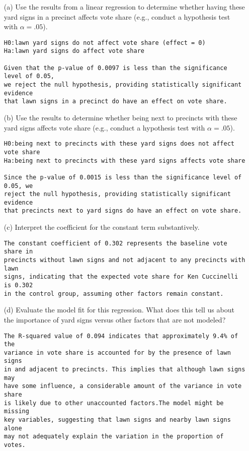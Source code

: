 \documentclass[12pt,letterpaper]{article}
\begin{document}
\begin{enumerate}
	\item [(a)] Use the results from a linear regression to determine whether having these yard signs in a precinct affects vote share (e.g., conduct a hypothesis test with $\alpha = .05$).
	
	\begin{verbatim}
H0:lawn yard signs do not affect vote share (effect = 0)
Ha:lawn yard signs do affect vote share

Given that the p-value of 0.0097 is less than the significance level of 0.05, 
we reject the null hypothesis, providing statistically significant evidence 
that lawn signs in a precinct do have an effect on vote share.
    \end{verbatim}
		
	\item [(b)]  Use the results to determine whether being
	next to precincts with these yard signs affects vote
	share (e.g., conduct a hypothesis test with $\alpha = .05$).
	
	\begin{verbatim}
H0:being next to precincts with these yard signs does not affect vote share
Ha:being next to precincts with these yard signs affects vote share

Since the p-value of 0.0015 is less than the significance level of 0.05, we 
reject the null hypothesis, providing statistically significant evidence 
that precincts next to yard signs do have an effect on vote share.
    \end{verbatim}

	\item [(c)] Interpret the coefficient for the constant term substantively.
	\begin{verbatim}
The constant coefficient of 0.302 represents the baseline vote share in 
precincts without lawn signs and not adjacent to any precincts with lawn 
signs, indicating that the expected vote share for Ken Cuccinelli is 0.302 
in the control group, assuming other factors remain constant.
    \end{verbatim}
    
	\item [(d)] Evaluate the model fit for this regression.  What does this	tell us about the importance of yard signs versus other factors that are not modeled?
	\begin{verbatim}
The R-squared value of 0.094 indicates that approximately 9.4% of the 
variance in vote share is accounted for by the presence of lawn signs 
in and adjacent to precincts. This implies that although lawn signs may 
have some influence, a considerable amount of the variance in vote share 
is likely due to other unaccounted factors.The model might be missing 
key variables, suggesting that lawn signs and nearby lawn signs alone 
may not adequately explain the variation in the proportion of votes.
    \end{verbatim}
\end{enumerate}  
\end{document}
